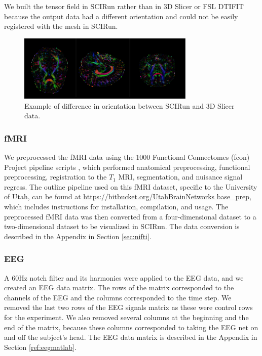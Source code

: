 We built the tensor field in SCIRun rather than in 3D Slicer \cite{ref:slicer} or FSL DTIFIT because the output data had a different orientation and could not be easily registered with the mesh in SCIRun.

\begin{figure}[H]
\begin{center}
\includegraphics[width=0.75\textwidth]{Figures/backwards.png}
\caption{Example of difference in orientation between SCIRun and 3D
  Slicer data.}
\label{fig:backwards}
\end{center}
\end{figure}

\subsubsection{fMRI}
\label{sec:fmripre}

We preprocessed the fMRI data using the 1000 Functional Connectomes (fcon) Project pipeline scripts \cite{ref:fcon}, which performed anatomical preprocessing, functional preprocessing, registration to the $T_1$ MRI, segmentation, and nuisance signal regress. The outline pipeline used on this fMRI dataset, specific to the University of Utah, can be found at \url{https://bitbucket.org/UtahBrainNetworks base_prep}, which includes instructions for installation, compilation, and usage. The preprocessed fMRI data was then converted from a four-dimensional dataset to a two-dimensional dataset to be visualized in SCIRun. The data conversion is described in the Appendix in Section \ref{sec:nifti}. 

\subsubsection{EEG}

A 60Hz notch filter and its harmonics \cite{ref:filter} were applied to the EEG data, and we created an EEG data matrix. The rows of the matrix corresponded to the channels of the EEG and the columns corresponded to the time step. We removed the last two rows of the EEG signals matrix as these were control rows for the experiment. We also removed several columns at the beginning and the end of the matrix, because these columns corresponded to taking the EEG net on and off the subject's head. The EEG data matrix is described in the Appendix in Section \ref{ref:eegmatlab}. 

